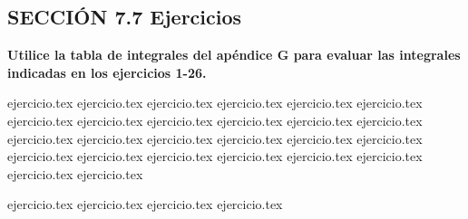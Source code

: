 \subsection*{SECCIÓN 7.7 \quad Ejercicios}

\noindent\textbf{Utilice la tabla de integrales del apéndice G para evaluar las integrales indicadas en los ejercicios 1-26.}
\begin{enumerate}
    {ejercicio.tex}
{ejercicio.tex}
{ejercicio.tex}
{ejercicio.tex}
{ejercicio.tex}
{ejercicio.tex}
{ejercicio.tex}
{ejercicio.tex}
{ejercicio.tex}
{ejercicio.tex}
{ejercicio.tex}
{ejercicio.tex}
{ejercicio.tex}
{ejercicio.tex}
{ejercicio.tex}
{ejercicio.tex}
{ejercicio.tex}
{ejercicio.tex}
{ejercicio.tex}
{ejercicio.tex}
{ejercicio.tex}
{ejercicio.tex}
{ejercicio.tex}
{ejercicio.tex}
{ejercicio.tex}
{ejercicio.tex}
\end{enumerate}

\vspace{0.5cm}
\begin{enumerate}
    \setcounter{enumi}{26}
    {ejercicio.tex}
{ejercicio.tex}
{ejercicio.tex}
{ejercicio.tex}
\end{enumerate}
